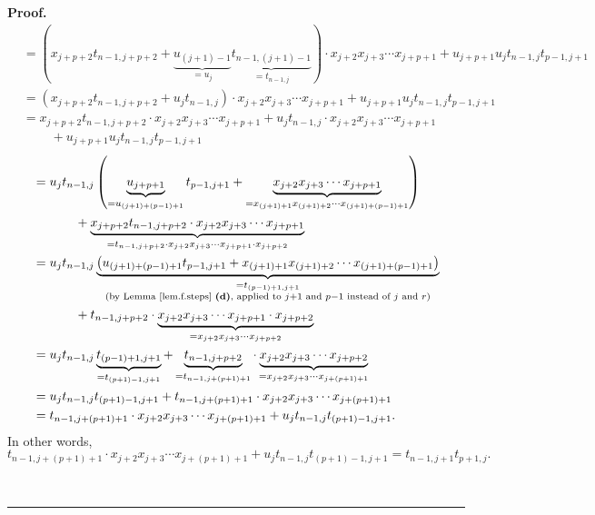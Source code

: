 \documentclass[numbers=enddot,12pt,final,onecolumn,notitlepage]{scrartcl}%
\theoremstyle{definition}
\newenvironment{proof}[1][Proof]{\noindent\textbf{#1.} }{\ \rule{0.5em}{0.5em}}
\newenvironment{verlong}{}{}
\begin{document}
\begin{proof}
\begin{verlong}
\begin{align*}
&  =\left(  x_{j+p+2}t_{n-1,j+p+2}+\underbrace{u_{\left(  j+1\right)  -1}%
}_{=u_{j}}\underbrace{t_{n-1,\left(  j+1\right)  -1}}_{=t_{n-1,j}}\right)
\cdot x_{j+2}x_{j+3}\cdots x_{j+p+1}+u_{j+p+1}u_{j}t_{n-1,j}t_{p-1,j+1}\\
&  =\left(  x_{j+p+2}t_{n-1,j+p+2}+u_{j}t_{n-1,j}\right)  \cdot x_{j+2}%
x_{j+3}\cdots x_{j+p+1}+u_{j+p+1}u_{j}t_{n-1,j}t_{p-1,j+1}\\
&  =x_{j+p+2}t_{n-1,j+p+2}\cdot x_{j+2}x_{j+3}\cdots x_{j+p+1}+u_{j}%
t_{n-1,j}\cdot x_{j+2}x_{j+3}\cdots x_{j+p+1}\\
&  \ \ \ \ \ \ \ \ \ \ +u_{j+p+1}u_{j}t_{n-1,j}t_{p-1,j+1}%
\end{align*}%
\begin{align*}
&  =u_{j}t_{n-1,j}\left(  \underbrace{u_{j+p+1}}_{=u_{\left(  j+1\right)
+\left(  p-1\right)  +1}}t_{p-1,j+1}+\underbrace{x_{j+2}x_{j+3}\cdots
x_{j+p+1}}_{=x_{\left(  j+1\right)  +1}x_{\left(  j+1\right)  +2}\cdots
x_{\left(  j+1\right)  +\left(  p-1\right)  +1}}\right) \\
&  \ \ \ \ \ \ \ \ \ \ +\underbrace{x_{j+p+2}t_{n-1,j+p+2}\cdot x_{j+2}%
x_{j+3}\cdots x_{j+p+1}}_{=t_{n-1,j+p+2}\cdot x_{j+2}x_{j+3}\cdots
x_{j+p+1}\cdot x_{j+p+2}}\\
&  =u_{j}t_{n-1,j}\underbrace{\left(  u_{\left(  j+1\right)  +\left(
p-1\right)  +1}t_{p-1,j+1}+x_{\left(  j+1\right)  +1}x_{\left(  j+1\right)
+2}\cdots x_{\left(  j+1\right)  +\left(  p-1\right)  +1}\right)
}_{\substack{=t_{\left(  p-1\right)  +1,j+1}\\\text{(by Lemma
\ref{lem.f.steps} \textbf{(d)}, applied to }j+1\text{ and }p-1\text{ instead
of }j\text{ and }r\text{)}}}\\
&  \ \ \ \ \ \ \ \ \ \ +t_{n-1,j+p+2}\cdot\underbrace{x_{j+2}x_{j+3}\cdots
x_{j+p+1}\cdot x_{j+p+2}}_{=x_{j+2}x_{j+3}\cdots x_{j+p+2}}\\
&  =u_{j}t_{n-1,j}\underbrace{t_{\left(  p-1\right)  +1,j+1}}_{=t_{\left(
p+1\right)  -1,j+1}}+\underbrace{t_{n-1,j+p+2}}_{=t_{n-1,j+\left(  p+1\right)
+1}}\cdot\underbrace{x_{j+2}x_{j+3}\cdots x_{j+p+2}}_{=x_{j+2}x_{j+3}\cdots
x_{j+\left(  p+1\right)  +1}}\\
&  =u_{j}t_{n-1,j}t_{\left(  p+1\right)  -1,j+1}+t_{n-1,j+\left(  p+1\right)
+1}\cdot x_{j+2}x_{j+3}\cdots x_{j+\left(  p+1\right)  +1}\\
&  =t_{n-1,j+\left(  p+1\right)  +1}\cdot x_{j+2}x_{j+3}\cdots x_{j+\left(
p+1\right)  +1}+u_{j}t_{n-1,j}t_{\left(  p+1\right)  -1,j+1}.
\end{align*}
In other words,%
\[
t_{n-1,j+\left(  p+1\right)  +1}\cdot x_{j+2}x_{j+3}\cdots x_{j+\left(
p+1\right)  +1}+u_{j}t_{n-1,j}t_{\left(  p+1\right)  -1,j+1}=t_{n-1,j+1}%
t_{p+1,j}.
\]


\end{verlong}
\end{proof}
\end{document}
